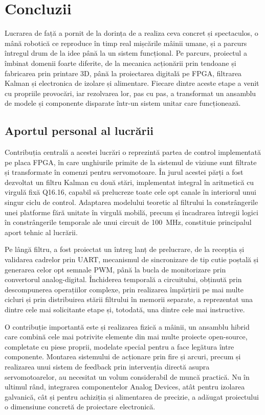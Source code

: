 \chapter{Concluzii}
\label{ch:concluzii}
\pagestyle{fancy}

Lucrarea de față a pornit de la dorința de a realiza ceva concret și spectaculos, o
mână robotică ce reproduce în timp real mișcările mâinii umane, și a parcurs întregul
drum de la idee până la un sistem funcțional. Pe parcurs, proiectul a îmbinat domenii
foarte diferite, de la mecanica acționării prin tendoane și fabricarea prin printare 3D,
până la proiectarea digitală pe FPGA, filtrarea Kalman și electronica de izolare și
alimentare. Fiecare dintre aceste etape a venit cu propriile provocări, iar rezolvarea
lor, pas cu pas, a transformat un ansamblu de modele și componente disparate într-un
sistem unitar care funcționează.

\section{Aportul personal al lucrării}
\label{sec:concluzii-contributii}

Contribuția centrală a acestei lucrări o reprezintă partea de control implementată pe
placa FPGA, în care unghiurile primite de la sistemul de viziune sunt filtrate și
transformate în comenzi pentru servomotoare. În jurul acestei părți a fost dezvoltat un
filtru Kalman cu două stări, implementat integral în aritmetică cu virgulă fixă Q16.16,
capabil să prelucreze toate cele opt canale în interiorul unui singur ciclu de control.
Adaptarea modelului teoretic al filtrului la constrângerile unei platforme fără unitate
în virgulă mobilă, precum și încadrarea întregii logici în constrângerile temporale ale
unui circuit de 100~MHz, constituie principalul aport tehnic al lucrării.

Pe lângă filtru, a fost proiectat un întreg lanț de prelucrare, de la recepția și
validarea cadrelor prin UART, mecanismul de sincronizare de tip cutie poștală și
generarea celor opt semnale PWM, până la bucla de monitorizare prin convertorul
analog-digital. Închiderea temporală a circuitului, obținută prin descompunerea
operațiilor complexe, prin realizarea împărțirii pe mai multe cicluri și prin
distribuirea stării filtrului în memorii separate, a reprezentat una dintre cele mai
solicitante etape și, totodată, una dintre cele mai instructive.

O contribuție importantă este și realizarea fizică a mâinii, un ansamblu hibrid care
combină cele mai potrivite elemente din mai multe proiecte open-source, completate cu
piese proprii, modelate special pentru a face legătura între componente. Montarea
sistemului de acționare prin fire și arcuri, precum și realizarea unui sistem de
feedback prin intervenția directă asupra servomotoarelor, au necesitat un volum
considerabil de muncă practică. Nu în ultimul rând, integrarea componentelor Analog
Devices, atât pentru izolarea galvanică, cât și pentru achiziția și alimentarea de
precizie, a adăugat proiectului o dimensiune concretă de proiectare electronică.

